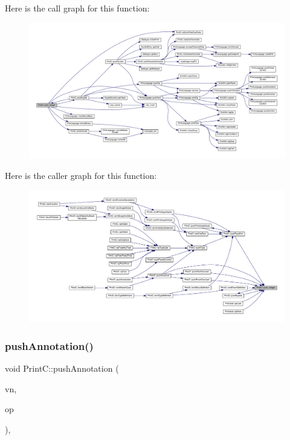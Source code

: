 Here is the call graph for this function\+:
\nopagebreak
\begin{figure}[H]
\begin{center}
\leavevmode
\includegraphics[width=350pt]{class_print_c_aa85a02ccc13756ecac61350ffd409e80_cgraph}
\end{center}
\end{figure}
Here is the caller graph for this function\+:
\nopagebreak
\begin{figure}[H]
\begin{center}
\leavevmode
\includegraphics[width=350pt]{class_print_c_aa85a02ccc13756ecac61350ffd409e80_icgraph}
\end{center}
\end{figure}
\mbox{\label{class_print_c_a234b95d9f3fdb8a79eeff02eb4acbca3}} 
\subsubsection{\texorpdfstring{pushAnnotation()}{pushAnnotation()}}
{\footnotesize\ttfamily void Print\+C\+::push\+Annotation (\begin{DoxyParamCaption}\item[{const \mbox{\hyperlink{class_varnode}{Varnode}} $\ast$}]{vn,  }\item[{const \mbox{\hyperlink{class_pcode_op}{Pcode\+Op}} $\ast$}]{op }\end{DoxyParamCaption})\hspace{0.3cm}{\ttfamily [protected]}, {\ttfamily [virtual]}}



